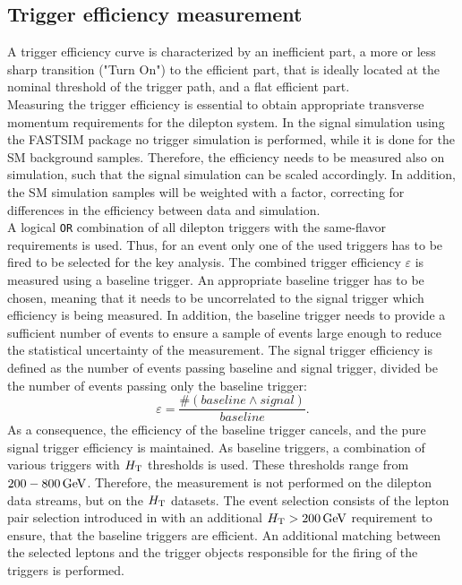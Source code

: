 \subsection{Trigger efficiency measurement}
A trigger efficiency curve is characterized by an inefficient part, a more or less sharp transition ("Turn On") to the efficient part, that is ideally located at the nominal threshold of the trigger path, and a flat efficient part.\\
Measuring the trigger efficiency is essential to obtain appropriate transverse momentum requirements for the dilepton system. In the signal simulation using the \textsc{FASTSIM} package no trigger simulation is performed, while it is done for the SM background samples. Therefore, the efficiency needs to be measured also on simulation, such that the signal simulation can be scaled accordingly. In addition, the SM simulation samples will be weighted with a factor, correcting for differences in the efficiency between data and simulation.\\
A logical \texttt{OR} combination of all dilepton triggers with the same-flavor requirements is used. Thus, for an event only one of the used triggers has to be fired to be selected for the key analysis. The combined trigger efficiency $\varepsilon$ is measured using a baseline trigger. An appropriate baseline trigger has to be chosen, meaning that it needs to be uncorrelated to the signal trigger which efficiency is being measured. In addition, the baseline trigger needs to provide a sufficient number of events to ensure a sample of events large enough to reduce the statistical uncertainty of the measurement. The signal trigger efficiency is defined as the number of events passing baseline and signal trigger, divided be the number of events passing only the baseline trigger:
\begin{equation}
 \varepsilon=\frac{\#(baseline \wedge signal)}{baseline}.
\end{equation}
As a consequence, the efficiency of the baseline trigger cancels, and the pure signal trigger efficiency is maintained. As baseline triggers, a combination of various triggers with $H_{\mathrm{T}}$ thresholds is used. These thresholds range from $200-800\,\text{Ge\hspace{-.08em}V}$. Therefore, the measurement is not performed on the dilepton data streams, but on the $H_{\mathrm{T}}$ datasets. The event selection consists of the lepton pair selection introduced in  with an additional $H_{\mathrm{T}}>200\,\text{Ge\hspace{-.08em}V}$ requirement to ensure, that the baseline triggers are efficient. An additional matching between the selected leptons and the trigger objects responsible for the firing of the triggers is performed.\\
